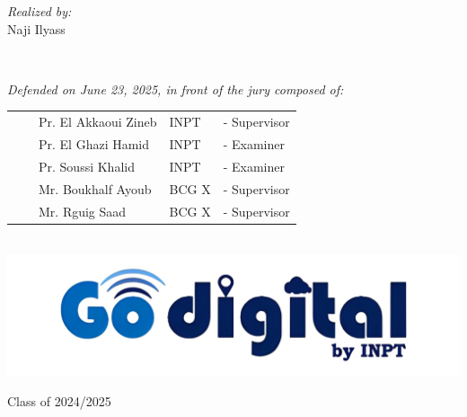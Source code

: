 \begin{titlepage}
\begin{center}
  \noindent
  \begin{minipage}{0.9\textwidth}
    \vspace{-7mm}
    \begin{flushleft} \large
      \emph{Realized by:}\\ \vspace{0.2cm}
      \hspace{0.95cm} Naji Ilyass  \\
    \end{flushleft}
  \end{minipage}
  \begin{minipage}{0.4\textwidth}
  \end{minipage}\\[1.7cm]

  \begin{minipage}{0.9\textwidth}
    \vspace{-7mm}
    \begin{flushleft} \large
      \emph{Defended on June 23, 2025, in front of the jury composed of:}\\ \vspace{0.3cm}
      \begin{tabular}{ll  l l l}
      &&Pr. El Akkaoui Zineb & INPT  & - Supervisor \\
      &&Pr. El Ghazi Hamid & INPT  & - Examiner \\
      &&Pr. Soussi Khalid & INPT  & - Examiner \\
      &&Mr. Boukhalf Ayoub & BCG X & - Supervisor \\
      &&Mr. Rguig Saad & BCG X & - Supervisor \\
      \end{tabular}
    \end{flushleft}
  \end{minipage}\\[1cm]


  \includegraphics[scale=0.3]{Images/go digital.jpg}
  
  \vspace{0.5cm}
  {\large Class of 2024/2025}
  
  \end{center}
  \end{titlepage}
  